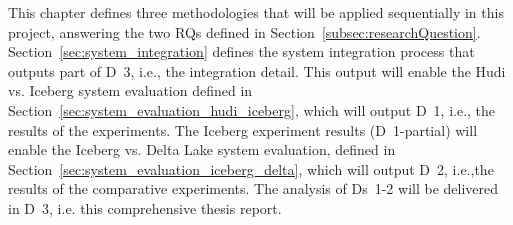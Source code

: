 This chapter defines three methodologies that will be applied sequentially in this project, answering the two \glspl{RQ} defined in Section~\ref{subsec:researchQuestion}. Section~\ref{sec:system_integration} defines the system integration process that outputs part of \gls{D}~3, i.e., the integration detail. This output will enable the Hudi vs. Iceberg system evaluation defined in Section~\ref{sec:system_evaluation_hudi_iceberg}, which will output \gls{D}~1, i.e., the results of the experiments. The Iceberg experiment results (\gls{D}~1-partial) will enable the Iceberg vs. Delta Lake system evaluation, defined in Section~\ref{sec:system_evaluation_iceberg_delta}, which will output \gls{D}~2, i.e.,the results of the comparative experiments. The analysis of \glspl{D}~1-2 will be delivered in \gls{D}~3, i.e. this comprehensive thesis report.